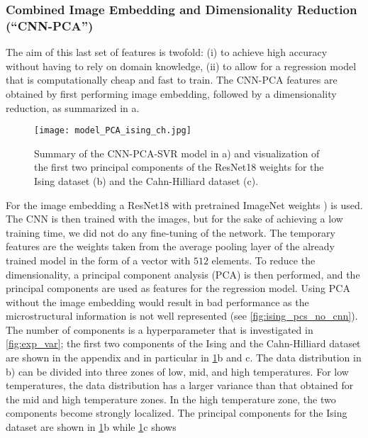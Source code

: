 \documentclass[11pt, authoryear]{elsarticle}
\begin{document}
	
	
	\subsubsection{Combined Image Embedding and Dimensionality Reduction (``CNN-PCA'')}
	\label{sec:CNN-PCA-SVR}
	The aim of this last set of features is twofold: (i) to achieve high accuracy 
	without having to rely on domain knowledge, (ii) to allow for a regression 
	model that is computationally cheap and fast to train. The CNN-PCA features
	are obtained by first performing image embedding, followed by a dimensionality
	reduction, as summarized in a.
	\begin{figure}
		\centering
		\texttt{[image: model\_PCA\_ising\_ch.jpg]}
		\caption[]{%
			Summary of the CNN-PCA-SVR model in a) and visualization of the 
			first two principal components of the ResNet18 weights for the 
			Ising dataset (b) and the Cahn-Hilliard dataset (c).
		}
		\label{fig:model_PCA_ising_ch}
	\end{figure}
	For the image embedding a ResNet18 with pretrained ImageNet weights 
	\cite{deng2009imagenet}) is used. The CNN is then trained with the 
	images, but for the sake of achieving a low training time, we did not do 
	any fine-tuning of the network. The temporary features are the weights taken 
	from the average pooling layer of the already trained model in the form of a vector 
	with $512$ elements.
	To reduce the dimensionality, a principal component analysis (PCA) is then
	performed, and the principal components are used as features for the regression 
	model. Using PCA without the image embedding would result in bad performance
	as the microstructural information is not well represented (see 
	\cref{fig:ising_pcs_no_cnn}). The number of components is a hyperparameter
	that is investigated in \cref{fig:exp_var}; the first two components of the 
	Ising and the Cahn-Hilliard dataset are shown in the appendix and in particular 
	in \cref{fig:model_PCA_ising_ch}b and c.
	The data distribution in b) can be divided into three zones of low, 
	mid, and high temperatures. For low temperatures, the data distribution 
	has a larger variance than that obtained for the mid and high temperature 
	zones. In the high temperature zone, the two components become strongly 
	localized. The principal components for the Ising dataset are shown in \cref{fig:model_PCA_ising_ch}b while \cref{fig:model_PCA_ising_ch}c  shows 
\end{document}
